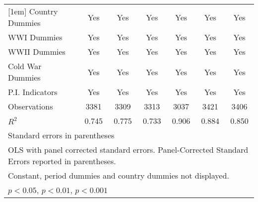 \documentclass[11pt]{article}
\begin{document}
\begin{table}[htbp]
\begin{tabular}{l*{6}{c}}
[1em]
Country Dummies     &         Yes         &         Yes         &         Yes         &         Yes         &         Yes         &         Yes         \\
[1em]
WWI Dummies         &         Yes         &         Yes         &         Yes         &         Yes         &         Yes         &         Yes         \\
[1em]
WWII Dummies        &         Yes         &         Yes         &         Yes         &         Yes         &         Yes         &         Yes         \\
[1em]
Cold War Dummies    &         Yes         &         Yes         &         Yes         &         Yes         &         Yes         &         Yes         \\
[1em]
P.I. Indicators     &         Yes         &         Yes         &         Yes         &         Yes         &         Yes         &         Yes         \\
\hline
Observations        &        3381         &        3309         &        3313         &        3037         &        3421         &        3406         \\
\(R^{2}\)           &       0.745         &       0.775         &       0.733         &       0.906         &       0.884         &       0.850         \\
\hline\hline
\multicolumn{7}{l}{\footnotesize Standard errors in parentheses}\\
\multicolumn{7}{l}{\footnotesize OLS with panel corrected standard errors. Panel-Corrected Standard Errors reported in parentheses.}\\
\multicolumn{7}{l}{\footnotesize Constant, period dummies and country dummies not displayed.}\\
\multicolumn{7}{l}{\footnotesize \sym{*} \(p<0.05\), \sym{**} \(p<0.01\), \sym{***} \(p<0.001\)}\\
\end{tabular}
\end{table}
\end{document}
